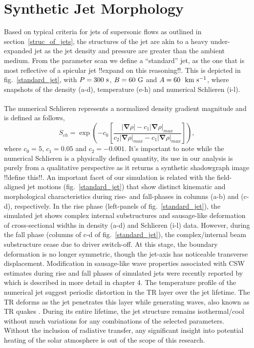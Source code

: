 \documentclass[12pt]{ociamthesis}
\newcommand{\kms}{~\rm{km ~s^{-1}}}
\newcommand{\np}{\\ \\}
\begin{document}
\section{Synthetic Jet Morphology}
Based on typical criteria for jets of supersonic flows as outlined in section~\ref{struc_of_jets}, the structures of the jet are akin to a heavy under-expanded jet \citep{Norman1982, Edgington-Mitchell2014} as the jet density and pressure are greater than the ambient medium. From the parameter scan we define a ``standard'' jet, as the one that is most reflective of a spicular jet {\color{green}!!expand on this reasoning!!}. This is depicted in fig.~\ref{standard_jet}, with $P=300~\rm{s}$, $B=60~\rm{G}$ and $A=60~\kms$, where snapshots of the density (a-d), temperature (e-h) and numerical Schlieren (i-l). \np
%
The numerical Schlieren represents a normalized density gradient magnitude and is defined as follows,
\begin{equation}
    S_{ch} = \exp{\left( -c_0 \left[ \frac{|\boldsymbol{\nabla} \rho|-c_1 |\boldsymbol{\nabla} \rho|_{max}}{c_2 |\boldsymbol{\nabla} \rho|_{max}-c_1|\boldsymbol{\nabla} \rho|_{max}} \right] \right)}, 
\end{equation}
where $c_0=5$, $c_1=0.05$ and $c_2=-0.001$. It's important to note while the numerical Schlieren is a physically defined quantity, its use in our analysis is purely from a qualitative perspective as it returns a synthetic shadowgraph image {\color{green}!!define this!!}. An important facet of our simulation is related with the field-aligned jet motions (fig.~\ref{standard_jet}) that show distinct kinematic and morphological characteristics during rise- and fall-phases in columns (a-b) and (c-d), respectively. In the rise phase (left-panels of fig.~\ref{standard_jet}), the simulated jet shows complex internal substructures and sausage-like deformation of cross-sectional widths in density (a-d) and Schlieren (i-l) data. However, during the fall phase (columns of c-d of fig.~\ref{standard_jet}), the complex/internal beam substructure cease due to driver switch-off. At this stage, the boundary deformation is no longer symmetric, though the jet-axis has noticeable transverse displacement. Modification in sausage-like wave properties associated with CSW estimates during rise and fall phases of simulated jets were recently reported by \cite{Dover2020ApJ90572D} which is described in more detail in chapter 4. The temperature profile of the numerical jet suggest periodic distortion in the TR layer over the jet lifetime. The TR deforms as the jet penetrates this layer while generating waves, also known as TR quakes \citep{Scullion2011ApJ74314S}. During its entire lifetime, the jet structure remains isothermal/cool without much variations for any combinations of the selected parameters. Without the inclusion of radiative transfer, any significant insight into potential heating of the solar atmosphere is out of the scope of this research. \np
\end{document}
